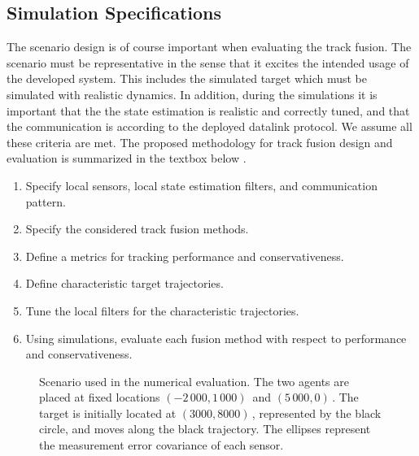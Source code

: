 \subsection{Simulation Specifications}

The scenario design is of course important when evaluating the track fusion. The scenario must be representative in the sense that it excites the intended usage of the developed system. This includes the simulated target which must be simulated with realistic dynamics. In addition, during the \abbrMC simulations it is important that the the state estimation is realistic and correctly tuned, and that the communication is according to the deployed datalink protocol. We assume all these criteria are met. The proposed methodology for track fusion design and evaluation is summarized in the textbox below \cite{Forsling2024CSM}.

\begin{mybox}[title={Track Fusion Design and Evaluation}]
\begin{small}
\begin{enumerate}
	\item Specify local sensors, local state estimation filters, and communication pattern.
	\item Specify the considered track fusion methods. 
	\item Define a metrics for tracking performance and conservativeness.
	\item Define characteristic target trajectories.
	\item Tune the local filters for the characteristic trajectories.
	\item Using \abbrMC simulations, evaluate each fusion method with respect to performance and conservativeness.
\end{enumerate}
\end{small}
\end{mybox}

\begin{figure}[tb]
	\centering
	\begin{tikzpicture}[scale=.4]
		
	\end{tikzpicture}
	\caption{Scenario used in the numerical evaluation. The two agents are placed at fixed locations $(-2\,000,1\,000)$\,\meter\xspace and $(5\,000,0)$\,\meter. The target is initially located at $(3000,8000)$\,\meter, represented by the black circle, and moves along the black trajectory. The ellipses represent the measurement error covariance of each sensor.}
	\label{fig:track-fusion-evaluation:scenario}
\end{figure}


